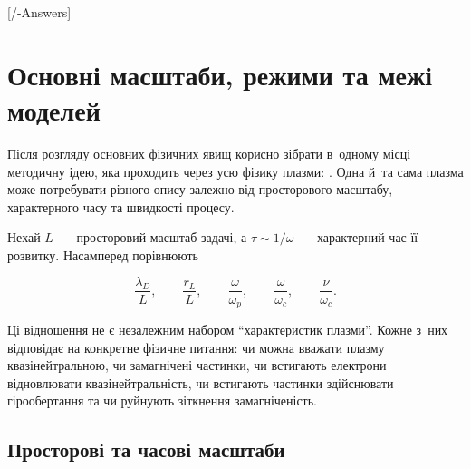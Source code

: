

\graphicspath{{\currfilebase/Pictures}}

[\currfilebase/\currfilebase-Answers]
\chapter{Основні масштаби, режими та межі моделей}
\label{sec:plasma-scales}\hypertarget{plasma-scales}{}

Після розгляду основних фізичних явищ корисно зібрати в~одному місці
методичну ідею, яка проходить через усю фізику плазми: . Одна й~та сама плазма може потребувати різного опису
залежно від просторового масштабу, характерного часу та швидкості
процесу.

Нехай $L$~--- просторовий масштаб задачі, а
$\tau\sim1/\omega$~--- характерний час її розвитку. Насамперед
порівнюють

\begin{equation*}
 \frac{\lambda_D}{L},\qquad
 \frac{r_L}{L},\qquad
 \frac{\omega}{\omega_p},\qquad
 \frac{\omega}{\omega_c},\qquad
 \frac{\nu}{\omega_c}.
\end{equation*}

Ці відношення не є незалежним набором \enquote{характеристик плазми}. Кожне
з~них відповідає на конкретне фізичне питання: чи можна вважати плазму
квазінейтральною, чи замагнічені частинки, чи встигають електрони
відновлювати квазінейтральність, чи встигають частинки здійснювати
гірообертання та чи руйнують зіткнення замагніченість.

\section{Просторові та часові масштаби}

